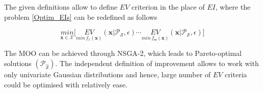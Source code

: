 The given definitions allow to define $EV$ criterion in the place of $EI$, where the problem \eqref{Optim_EIs} can be redefined as follows

 \begin{equation}\label{Optim_EVs}
 \underset{\bm x \in \mathcal{X}}{min}\Big[ \underset{min\,f_1(\bm{x})}{EV}(\bm{x}|\mathscr{P}_{\mathcal{S}},\epsilon) \cdots \underset{min\,f_{\mathsf{m}}(\bm{x})}{EV}(\bm{x}|\mathscr{P}_{\mathcal{S}},\epsilon)  \Big]
 \end{equation}
 
 The MOO can be achieved through NSGA-2, which leads to Pareto-optimal solutions $(\mathscr{P}_{\hat{\mathcal{S}}})$. The independent definition of improvement allows to work with only univariate Gaussian distributions and hence, large number of $EV$ criteria could be optimised with relatively ease.\\
 
